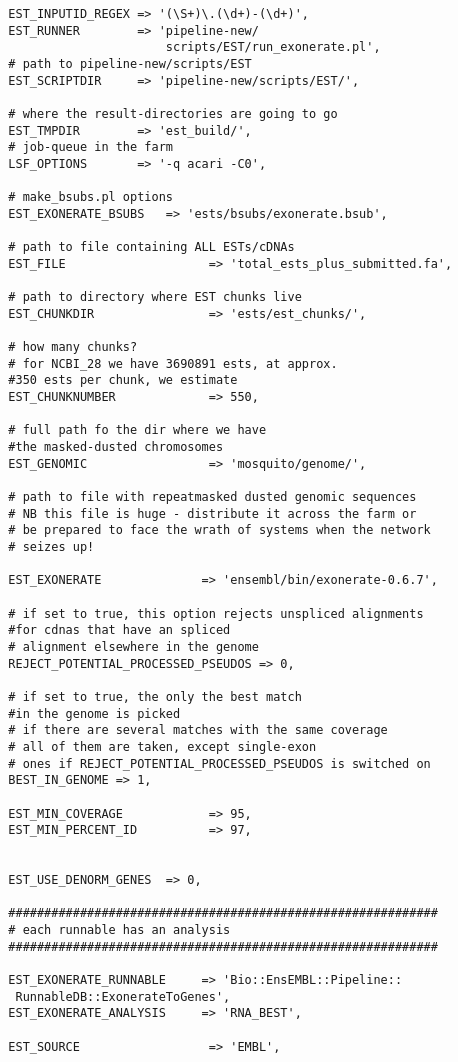 \documentclass[a4paper,10pt]{article}
\begin{document}
\begin{verbatim}
  EST_INPUTID_REGEX => '(\S+)\.(\d+)-(\d+)',
  EST_RUNNER        => 'pipeline-new/
                        scripts/EST/run_exonerate.pl',     
  # path to pipeline-new/scripts/EST
  EST_SCRIPTDIR     => 'pipeline-new/scripts/EST/',
              
  # where the result-directories are going to go        
  EST_TMPDIR        => 'est_build/',          
  # job-queue in the farm
  LSF_OPTIONS       => '-q acari -C0',
  
  # make_bsubs.pl options
  EST_EXONERATE_BSUBS   => 'ests/bsubs/exonerate.bsub',
  
  # path to file containing ALL ESTs/cDNAs
  EST_FILE                    => 'total_ests_plus_submitted.fa',
  
  # path to directory where EST chunks live
  EST_CHUNKDIR                => 'ests/est_chunks/',
  
  # how many chunks?
  # for NCBI_28 we have 3690891 ests, at approx. 
  #350 ests per chunk, we estimate
  EST_CHUNKNUMBER             => 550,    
              
  # full path fo the dir where we have 
  #the masked-dusted chromosomes
  EST_GENOMIC                 => 'mosquito/genome/',
  
  # path to file with repeatmasked dusted genomic sequences
  # NB this file is huge - distribute it across the farm or 
  # be prepared to face the wrath of systems when the network 
  # seizes up!
  
  EST_EXONERATE              => 'ensembl/bin/exonerate-0.6.7',
  
  # if set to true, this option rejects unspliced alignments 
  #for cdnas that have an spliced
  # alignment elsewhere in the genome
  REJECT_POTENTIAL_PROCESSED_PSEUDOS => 0,
  
  # if set to true, the only the best match 
  #in the genome is picked
  # if there are several matches with the same coverage
  # all of them are taken, except single-exon 
  # ones if REJECT_POTENTIAL_PROCESSED_PSEUDOS is switched on 
  BEST_IN_GENOME => 1,
  
  EST_MIN_COVERAGE            => 95,
  EST_MIN_PERCENT_ID          => 97,
  

  EST_USE_DENORM_GENES  => 0,
  
  ############################################################
  # each runnable has an analysis
  ############################################################
  
  EST_EXONERATE_RUNNABLE     => 'Bio::EnsEMBL::Pipeline::
   RunnableDB::ExonerateToGenes',      
  EST_EXONERATE_ANALYSIS     => 'RNA_BEST',
  
  EST_SOURCE                  => 'EMBL',      
  
\end{verbatim}
\end{document}

